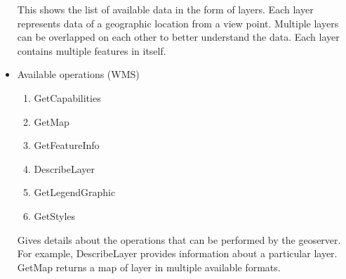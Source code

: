 \begin{itemize}
This shows the list of available data in the form of layers. Each layer represents data of a geographic location from a view point. Multiple layers can be overlapped on each other to better understand the data. Each layer contains multiple features in itself. 

\item Available operations (WMS)
\begin{enumerate}
\item GetCapabilities 
\item GetMap 
\item GetFeatureInfo 
\item DescribeLayer 
\item GetLegendGraphic 
\item GetStyles 
\end{enumerate}

Gives details about the operations that can be performed by the geoserver. For example, DescribeLayer provides information about a particular layer. GetMap returns a map of layer in multiple available formats. 


\end{itemize}

